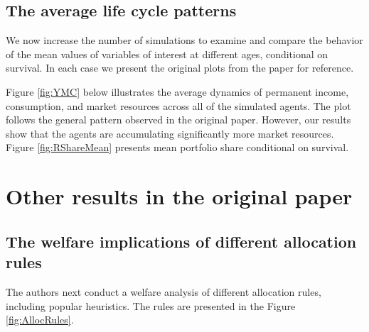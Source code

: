 \documentclass[./CGMPortfolio.tex]{subfiles}
\begin{document}
\providecommand{\figName}{Risky-Share-Simulation} %
\providecommand{\figFile}{RShare_Sim} %
\hypertarget{\figFile}{}
\hypertarget{\figName}{}

\subsection{The average life cycle patterns}

We now increase the number of simulations to examine and compare the behavior of the mean values of variables of interest at different ages, conditional on survival. In each case we present the original plots from the paper for reference.

Figure \ref{fig:YMC} below illustrates the average dynamics of permanent income, consumption, and market resources across all of the simulated agents. The plot follows the general pattern observed in the original paper. However, our results show that the agents are accumulating significantly more market resources. Figure \ref{fig:RShareMean} presents mean portfolio share conditional on survival.

\providecommand{\figName}{Variable-Means-Conditional-on-Survival} %
\providecommand{\figFile}{YMC_Means} %
\hypertarget{\figFile}{}
\hypertarget{\figName}{}

\providecommand{\figName}{RShare-Means-Conditional-on-Survival} %
\providecommand{\figFile}{RShare_Means} %
\hypertarget{\figFile}{}
\hypertarget{\figName}{}

\section{Other results in the original paper}

\subsection{The welfare implications of different allocation rules}

The authors next conduct a welfare analysis of different allocation rules, including popular heuristics. The rules are presented in the Figure \ref{fig:AllocRules}.
\end{document}
